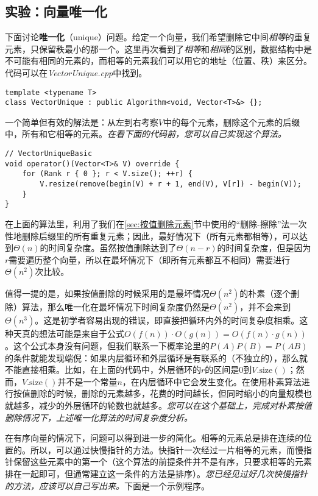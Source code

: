 \subsection{实验：向量唯一化}

下面讨论\textbf{唯一化}（unique）问题。给定一个向量，我们希望删除它中间\textit{相等}的重复元素，只保留秩最小的那一个。这里再次看到了\textit{相等}和\textit{相同}的区别，数据结构中是不可能有相同的元素的，而相等的元素我们可以用它的地址（位置、秩）来区分。代码可以在\textit{VectorUnique.cpp}中找到。

\begin{lstlisting}
template <typename T>
class VectorUnique : public Algorithm<void, Vector<T>&> {};
\end{lstlisting}

一个简单但有效的解法是：从左到右考察$V$中的每个元素，删除这个元素的后缀中，所有和它相等的元素。\textit{在看下面的代码前，您可以自己实现这个算法。}

\begin{lstlisting}
// VectorUniqueBasic
void operator()(Vector<T>& V) override {
    for (Rank r { 0 }; r < V.size(); ++r) {
        V.resize(remove(begin(V) + r + 1, end(V), V[r]) - begin(V));
    }
}
\end{lstlisting}

在上面的算法里，利用了我们在\ref{sec:按值删除元素}节中使用的“删除-擦除”法一次性地删除后缀里的所有重复元素；因此，最好情况下（所有元素都相等），可以达到$\Theta(n)$的时间复杂度。虽然按值删除达到了$\Theta(n-r)$的时间复杂度，但是因为$r$需要遍历整个向量，所以在最坏情况下（即所有元素都互不相同）需要进行$\Theta(n^2)$次比较。

值得一提的是，如果按值删除的时候采用的是最坏情况$\Theta(n^2)$的朴素（逐个删除）算法，那么唯一化在最坏情况下时间复杂度仍然是$\Theta(n^2)$，并不会来到$\Theta(n^3)$。这是初学者容易出现的错误，即直接把循环内外的时间复杂度相乘。这种天真的想法可能是来自于公式$O(f(n))\cdot O(g(n)) = O(f(n)\cdot g(n))$。这个公式本身没有问题，但我们联系一下概率论里的$P(A)P(B)=P(AB)$的条件就能发现端倪：如果内层循环和外层循环是有联系的（不独立的），那么就不能直接相乘。比如，在上面的代码中，外层循环的$r$的区间是0到$V\mathrm{.size}()$；然而，$V\mathrm{.size}()$并不是一个常量$n$，在内层循环中它会发生变化。在使用朴素算法进行按值删除的时候，删除的元素越多，花费的时间越长，但同时缩小的向量规模也就越多，减少的外层循环的轮数也就越多。\textit{您可以在这个基础上，完成对朴素按值删除情况下，上述唯一化算法的时间复杂度分析。}

在有序向量的情况下，问题可以得到进一步的简化。相等的元素总是排在连续的位置的。所以，可以通过快慢指针的方法。快指针一次经过一片相等的元素，而慢指针保留这些元素中的第一个（这个算法的前提条件并不是有序，只要求相等的元素排在一起即可，但通常建立这一条件的方法是排序）。\textit{您已经见过好几次快慢指针的方法，应该可以自己写出来。}下面是一个示例程序。

